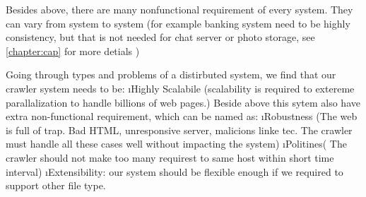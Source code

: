 Besides above, there are many nonfunctional requirement of every system. They can vary from system to system (for example banking system need to be highly consistency, but that is not needed for chat server or photo storage, see \ref{chapter:cap} for more detials )

Going through types and problems of a distirbuted system, we find that our crawler system needs to be:
\ls
\i Highly Scalabile (scalability is required to extereme parallalization to handle billions of web pages.)
    Beside above this sytem also have extra non-functional requirement, which can be named as:
\i Robustness (The web is full of trap. Bad HTML, unresponsive server, malicions linke tec. The crawler must handle all these cases well without impacting the system)
\i Politines( The crawler should not make too many requirest to same host within short time interval)
\i Extensibility: our system should be flexible enough if we required to support other file type.
\le
